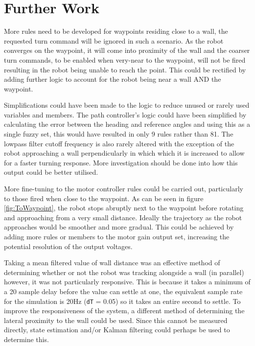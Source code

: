 \documentclass[10pt]{article}
\begin{document}
\section{Further Work}
More rules need to be developed for waypoints residing close to a wall, the requested turn command will be ignored in such a scenario.
As the robot converges on the waypoint, it will come into proximity of the wall and the coarser turn commands, to be enabled when very-near to the waypoint, will not be fired resulting in the robot being unable to reach the point.
This could be rectified by adding further logic to account for the robot being near a wall AND the waypoint. 

\medskip
Simplifications could have been made to the logic to reduce unused or rarely used variables and members. 
The path controller's logic could have been simplified by calculating the error between the heading and reference angles and using this as a single fuzzy set, this would have resulted in only 9 rules rather than 81. 
The lowpass filter cutoff frequency is also rarely altered with the exception of the robot approaching a wall perpendicularly in which which it is increased to allow for a faster turning response.
More investigation should be done into how this output could be better utilised. 

\medskip
More fine-tuning to the motor controller rules could be carried out, particularly to those fired when close to the waypoint.
As can be seen in figure \ref{fig:ToWaypoint}, the robot stops abruptly next to the waypoint before rotating and approaching from a very small distance.
Ideally the trajectory as the robot approaches would be smoother and more gradual.
This could be achieved by adding more rules or members to the motor gain output set, increasing the potential resolution of the output voltages.  

\medskip
Taking a mean filtered value of wall distance was an effective method of determining whether or not the robot was tracking alongside a wall (in parallel) however, it was not particularly responsive.
This is because it takes a minimum of a 20 sample delay before the value can settle at one, the equivalent sample rate for the simulation is 20Hz (\lstinline{dT} = 0.05) so it takes an entire second to settle.
To improve the responsiveness of the system, a different method of determining the lateral proximity to the wall could be used.
Since this cannot be measured directly, state estimation and/or Kalman filtering could perhaps be used to determine this. 

\end{document}
